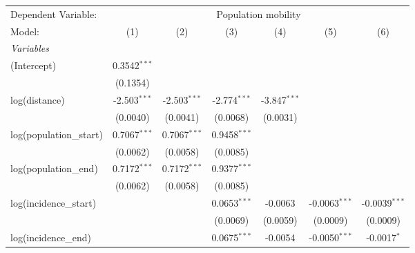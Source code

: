 \documentclass[10pt,a4paper]{article}
\author{Peer Lasse Hinrichsen}
\begin{document}
\begingroup
\centering
\begin{tabular}{lcccccc}
   \tabularnewline \midrule \midrule
   Dependent Variable: & \multicolumn{6}{c}{Population mobility}\\
   Model:                                           & (1)            & (2)            & (3)             & (4)            & (5)             & (6)\\  
   \midrule
   \emph{Variables}\\
   (Intercept)                                      & 0.3542$^{***}$ &                &                 &                &                 &   \\   
                                                    & (0.1354)       &                &                 &                &                 &   \\   
   log(distance)                                    & -2.503$^{***}$ & -2.503$^{***}$ & -2.774$^{***}$  & -3.847$^{***}$ &                 &   \\   
                                                    & (0.0040)       & (0.0041)       & (0.0068)        & (0.0031)       &                 &   \\   
   log(population\_start)                           & 0.7067$^{***}$ & 0.7067$^{***}$ & 0.9458$^{***}$  &                &                 &   \\   
                                                    & (0.0062)       & (0.0058)       & (0.0085)        &                &                 &   \\   
   log(population\_end)                             & 0.7172$^{***}$ & 0.7172$^{***}$ & 0.9377$^{***}$  &                &                 &   \\   
                                                    & (0.0062)       & (0.0058)       & (0.0085)        &                &                 &   \\   
   log(incidence\_start)                            &                &                & 0.0653$^{***}$  & -0.0063        & -0.0063$^{***}$ & -0.0039$^{***}$\\   
                                                    &                &                & (0.0069)        & (0.0059)       & (0.0009)        & (0.0009)\\   
   log(incidence\_end)                              &                &                & 0.0675$^{***}$  & -0.0054        & -0.0050$^{***}$ & -0.0017$^{*}$\\   

\end{tabular}
\end{document}
